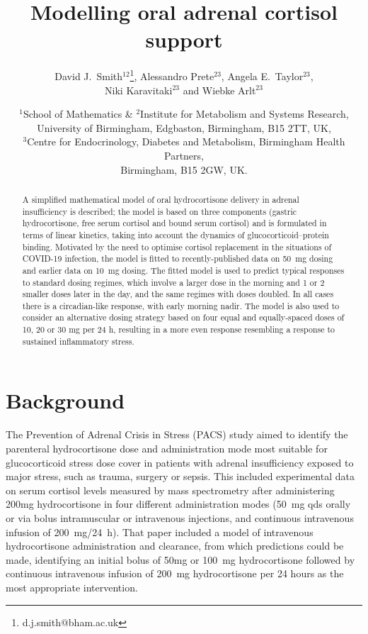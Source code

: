\documentclass[12pt,a4paper]{article}
\title{Modelling oral adrenal cortisol support}
\author{David J.\ Smith\(^{12}\)\thanks{d.j.smith@bham.ac.uk}, Alessandro Prete\(^{23}\), Angela E.\ Taylor\(^{23}\),\\ Niki Karavitaki\(^{23}\) and Wiebke Arlt\(^{23}\)}
\date{\small \(^1\)School of Mathematics \& \(^2\)Institute for Metabolism and Systems Research,\\ University of Birmingham, Edgbaston, Birmingham, B15 2TT, UK,\\[0.5em] \(^3\)Centre for Endocrinology, Diabetes and Metabolism, Birmingham Health Partners,\\ Birmingham, B15 2GW, UK.}
\begin{document}
\maketitle

\begin{abstract}
    A simplified mathematical model of oral hydrocortisone delivery in adrenal insufficiency is described; the model is based on three components (gastric hydrocortisone, free serum cortisol and bound serum cortisol) and is formulated in terms of linear kinetics, taking into account the dynamics of glucocorticoid--protein binding. Motivated by the need to optimise cortisol replacement in the situations of COVID-19 infection, the model is fitted to recently-published data on 50~mg dosing and earlier data on 10~mg dosing. The fitted model is used to predict typical responses to standard dosing regimes, which involve a larger dose in the morning and 1 or 2 smaller doses later in the day, and the same regimes with doses doubled. In all cases there is a circadian-like response, with early morning nadir. The model is also used to consider an alternative dosing strategy based on four equal and equally-spaced doses of 10, 20 or 30 mg per 24 h, resulting in a more even response resembling a response to sustained inflammatory stress.
\end{abstract}

\section*{Background}

The Prevention of Adrenal Crisis in Stress (PACS) study \cite{prete2020} aimed to identify the parenteral hydrocortisone dose and administration mode most suitable for glucocorticoid stress dose cover in patients with adrenal insufficiency exposed to major stress, such as trauma, surgery or sepsis. This included experimental data on serum cortisol levels measured by mass spectrometry after administering 200mg hydrocortisone in four different administration modes (50~mg qds orally or via bolus intramuscular or intravenous injections, and continuous intravenous infusion of 200~mg/24~h). That paper included a model of intravenous hydrocortisone administration and clearance, from which predictions could be made, identifying an initial bolus of 50mg or 100~mg hydrocortisone followed by continuous intravenous infusion of 200~mg hydrocortisone per 24 hours as the most appropriate intervention.
 
\end{document}
